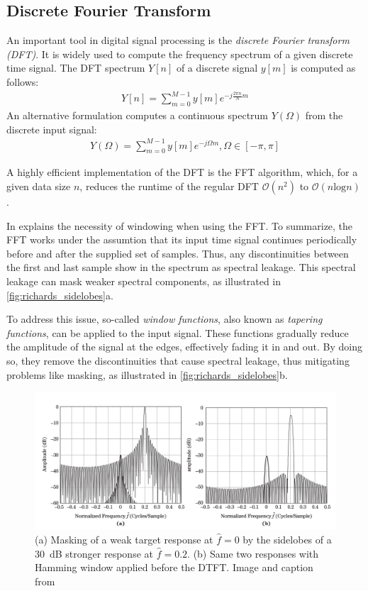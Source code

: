 \subsection{Discrete Fourier Transform}
An important tool in digital signal processing is the \emph{discrete Fourier transform (DFT)}.
It is widely used to compute the frequency spectrum of a given discrete time signal.
The DFT spectrum $Y[n]$ of a discrete signal $y[m]$ is computed as follows:
\begin{align}
    Y[n] = \sum_{m=0}^{M-1}y[m]e^{-j\frac{2\pi n}{N}m}
\end{align}
An alternative formulation computes a continuous spectrum $Y(\Omega)$
from the discrete input signal:
\begin{align}
    Y(\Omega) = \sum_{m=0}^{M-1}y[m]e^{-j\Omega m}, \Omega \in [-\pi, \pi]
\end{align}

A highly efficient implementation of the DFT is the FFT algorithm, which,
for a given data size $n$, reduces the runtime of the regular DFT $\mathcal O(n^2)$ to $\mathcal O(n\text{log}n)$ \cite{fft_algorithm}.

In \cite[pp. 509--513]{richards} explains the necessity of windowing when using the FFT.
To summarize, the FFT works under the assumtion that its input time signal continues periodically before and after the supplied set of samples.
Thus, any discontinuities between the first and last sample show in the spectrum as spectral leakage.
This spectral leakage can mask weaker spectral components, as illustrated in \autoref{fig:richards_sidelobes}a.

To address this issue, so-called \emph{window functions}, also known as \emph{tapering functions},
can be applied to the input signal. These functions gradually reduce the amplitude of the signal at the edges,
effectively fading it in and out. By doing so, they remove the discontinuities that cause spectral leakage,
thus mitigating problems like masking, as illustrated in \autoref{fig:richards_sidelobes}b.
\begin{figure}
    \centering
    \includegraphics[width=\textwidth]{../../figures/richards_sidelobe_masking.pdf}
    \caption{
        (a) Masking of a weak target response at $\hat f = 0$ by the sidelobes of a \SI{30}{\dB} stronger response at $\hat f = 0.2$.
        (b) Same two responses with Hamming window applied before the DTFT.
        Image and caption from \cite[p.510]{richards}}
    \label{fig:richards_sidelobes}
\end{figure}


